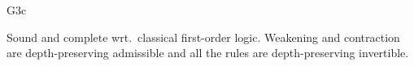 \begin{entry}{G3c}

\begin{technicalities}
  Sound and complete wrt.\ classical first-order logic.  Weakening and
  contraction are depth-preserving admissible and all the rules are
  depth-preserving invertible.
\end{technicalities}







\end{entry}

